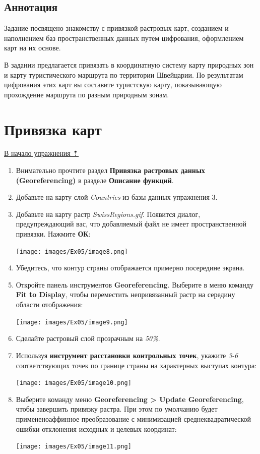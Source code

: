 \documentclass[12pt,]{book}
\begin{document}
\hypertarget{map-ref-general-anno}{%
\subsection{Аннотация}\label{map-ref-general-anno}}

Задание посвящено знакомству с привязкой растровых карт, созданием и наполнением баз пространственных данных путем цифрования, оформлением карт на их основе.

В задании предлагается привязать в координатную систему карту природных зон и карту туристического маршрута по территории Швейцарии. По результатам цифрования этих карт вы составите туристскую карту, показывающую прохождение маршрута по разным природным зонам.

\hypertarget{map-ref-general-referencing}{%
\section{Привязка карт}\label{map-ref-general-referencing}}

\protect\hyperlink{map-ref-general}{В начало упражнения ⇡}

\begin{enumerate}
\def\labelenumi{\arabic{enumi}.}
\item
  Внимательно прочтите раздел \textbf{Привязка растровых данных (Georeferencing)} в разделе \textbf{Описание функций}.
\item
  Добавьте на карту слой \emph{Countries} из базы данных упражнения 3.
\item
  Добавьте на карту растр \emph{SwissRegions.gif}. Появится диалог, предупреждающий вас, что добавляемый файл не имеет пространственной привязки. Нажмите \textbf{ОК}:

  \texttt{[image: images/Ex05/image8.png]}
\item
  Убедитесь, что контур страны отображается примерно посередине экрана.
\item
  Откройте панель инструментов \textbf{Georeferencing}. Выберите в меню команду \textbf{Fit to Display}, чтобы переместить непривязанный растр на середину области отображения:

  \texttt{[image: images/Ex05/image9.png]}
\item
  Сделайте растровый слой прозрачным на \emph{50\%}.
\item
  Используя \textbf{инструмент расстановки контрольных точек}, укажите \emph{3-6} соответствующих точек по границе страны на характерных выступах контура:

  \texttt{[image: images/Ex05/image10.png]}
\item
  Выберите команду меню \textbf{Georeferencing \textgreater{} Update Georeferencing}, чтобы завершить привязку растра. При этом по умолчанию будет примененоаффинное преобразование с минимизацией среднеквадратической ошибки отклонения исходных и целевых координат:

  \texttt{[image: images/Ex05/image11.png]}
\end{enumerate}
\end{document}

